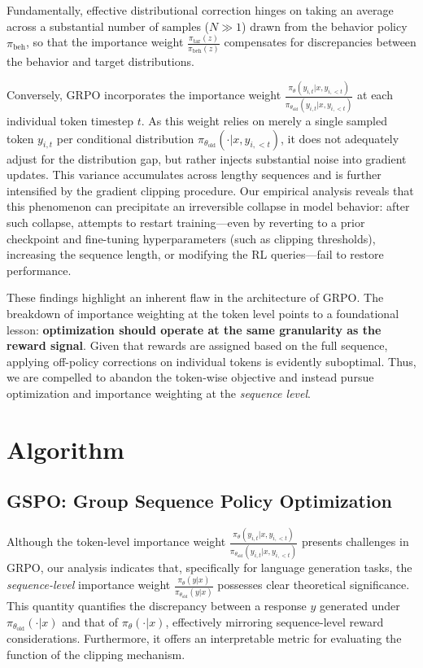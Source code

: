 Fundamentally, effective distributional correction hinges on taking an average across a substantial number of samples ($N \gg 1$) drawn from the behavior policy $\pi_\text{beh}$, so that the importance weight $\frac{ \pi_\text{tar} (z) }{ \pi_\text{beh} (z)}$ compensates for discrepancies between the behavior and target distributions.

Conversely, GRPO incorporates the importance weight $\frac{ \pi_{\theta} (y_{i,t} | x, y_{i,<t}) }{ \pi_{\theta_\text{old}} (y_{i,t} | x,y_{i,<t})}$ at each individual token timestep $t$. As this weight relies on merely a single sampled token $y_{i,t}$ per conditional distribution $\pi_{\theta_\text{old}}( \cdot | x, y_{i, <t})$, it does not adequately adjust for the distribution gap, but rather injects substantial noise into gradient updates. This variance accumulates across lengthy sequences and is further intensified by the gradient clipping procedure. Our empirical analysis reveals that this phenomenon can precipitate an irreversible collapse in model behavior: after such collapse, attempts to restart training—even by reverting to a prior checkpoint and fine-tuning hyperparameters (such as clipping thresholds), increasing the sequence length, or modifying the RL queries—fail to restore performance.

These findings highlight an inherent flaw in the architecture of GRPO. The breakdown of importance weighting at the token level points to a foundational lesson: \textbf{optimization should operate at the same granularity as the reward signal}. Given that rewards are assigned based on the full sequence, applying off-policy corrections on individual tokens is evidently suboptimal. Thus, we are compelled to abandon the token-wise objective and instead pursue optimization and importance weighting at the \textit{sequence level}.

\section{Algorithm}

\subsection{GSPO: Group Sequence Policy Optimization}

Although the token-level importance weight $\frac{ \pi_{\theta} (y_{i,t} | x, y_{i,<t}) }{ \pi_{\theta_\text{old}} (y_{i,t} | x,y_{i,<t})}$ presents challenges in GRPO, our analysis indicates that, specifically for language generation tasks, the \textit{sequence-level} importance weight $\frac{ \pi_{\theta} (y | x) }{ \pi_{\theta_\text{old}} (y | x)}$ possesses clear theoretical significance. This quantity quantifies the discrepancy between a response $y$ generated under $\pi_{\theta_\text{old}} (\cdot | x)$ and that of $\pi_{\theta} (\cdot | x)$, effectively mirroring sequence-level reward considerations. Furthermore, it offers an interpretable metric for evaluating the function of the clipping mechanism.

